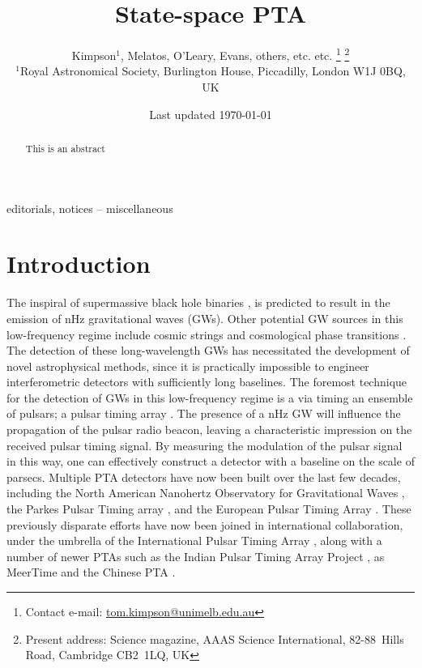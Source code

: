 \documentclass[fleqn,usenatbib,useAMS]{mnras}
\title[Kalman PTA]{State-space PTA}
\author[Kimpson]{Kimpson$^{1}$, Melatos, O'Leary, Evans, others, etc. etc. %
\thanks{Contact e-mail: \href{tom.kimpson@unimelb.edu.au}{tom.kimpson@unimelb.edu.au}}%
\thanks{Present address: Science magazine, AAAS Science International, \mbox{82-88}~Hills Road, Cambridge CB2~1LQ, UK}%
\\
$^{1}$Royal Astronomical Society, Burlington House, Piccadilly, London W1J 0BQ, UK}
\date{Last updated \today}
\begin{document}
\label{firstpage}
\pagerange{\pageref{firstpage}--\pageref{lastpage}}
\maketitle

\begin{abstract}
This is an abstract
\end{abstract}

\begin{keywords}
editorials, notices -- miscellaneous
\end{keywords}



\begingroup
\let\clearpage\relax
\endgroup
\newpage
\section{Introduction}
The inspiral of supermassive black hole binaries \citep[SMBHBs;][]{Rajagopal1995,Wyithe2003,Sesana2013,Ravi2015MNRAS.447.2772R},  is predicted to result in the emission of nHz gravitational waves (GWs). Other potential GW sources in this low-frequency regime include cosmic strings \citep[e.g.][]{PTAstring} and cosmological phase transitions \citep[e.g.][]{PTAphase}. The detection of these long-wavelength GWs has necessitated the development of novel astrophysical methods, since it is practically impossible to engineer interferometric detectors with sufficiently long baselines. The foremost technique for the detection of GWs in this  low-frequency regime is a via timing an ensemble of pulsars; a pulsar timing array \citep[PTA;][]{2021hgwa.bookE...4V}. The presence  of a nHz GW will influence the propagation of the pulsar radio beacon, leaving a characteristic impression on the received pulsar timing signal. By measuring the modulation of the pulsar signal in this way, one can effectively construct a detector with a baseline on the scale of parsecs. Multiple PTA detectors have now been built over the last few decades, including the North American Nanohertz Observatory for Gravitational Waves \citep[NANOGrav,][]{2020ApJ...905L..34A}, the Parkes Pulsar Timing array \citep[PPTA][]{2020PASA...37...20K}, and the European Pulsar Timing Array \citep[EPTA,][]{2010CQGra..27h4014F}. These previously disparate efforts have now been joined in international collaboration, under the umbrella of the International Pulsar Timing Array \citep[IPTA,][]{2019MNRAS.490.4666P}, along with a number of newer PTAs such as the Indian Pulsar Timing Array Project \citep[InPTA,][]{ipta}, as MeerTime \citep{meertime2,Meertime} and the Chinese PTA \citep{Hobbs_2019}. \newline 
\end{document}
